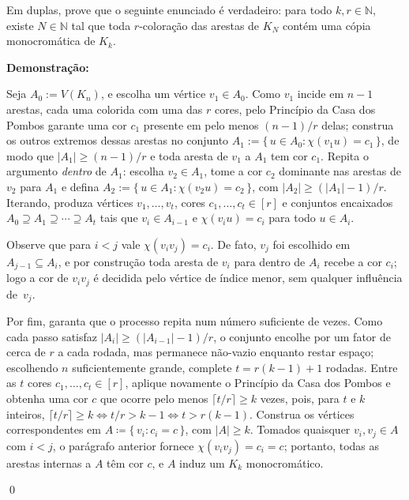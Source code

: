 \documentclass[12pt]{article}
\newenvironment{problem}[2][Exercício]{\begin{trivlist}
\item[\hskip \labelsep {\bfseries #1}\hskip \labelsep {\bfseries #2.}]}{\end{trivlist}}
\newenvironment{sol}
    {\textbf{Demonstração:}\emph{}
    }
    {
    \qed
    }
\begin{document}

\begin{problem}{1}
    Em duplas, prove que o seguinte enunciado é verdadeiro: para todo $k, r \in \mathbb{N}$, existe $N \in \mathbb{N}$ tal que toda $r$-coloração das arestas de $K_N$ contém uma cópia monocromática de $K_k$.
\end{problem}
\begin{sol}
    Seja $A_0:=V(K_n)$, e escolha um vértice $v_1\in A_0$. Como $v_1$ incide em
    $n-1$ arestas, cada uma colorida com uma das $r$ cores, pelo Princípio da Casa dos Pombos garante uma cor $c_1$ presente em pelo menos $(n-1)/r$ delas; construa os outros extremos dessas arestas no conjunto $A_1:=\{\,u\in A_0:\chi(v_1u)=c_1\,\}$, de modo que $|A_1|\ge (n-1)/r$ e toda aresta de $v_1$ a $A_1$ tem cor $c_1$. Repita o argumento \emph{dentro} de $A_1$: escolha $v_2\in A_1$, tome a cor $c_2$ dominante nas arestas de $v_2$ para $A_1$ e defina $A_2:=\{\,u\in A_1:\chi(v_2u)=c_2\,\}$, com $|A_2|\ge(|A_1|-1)/r$. Iterando, produza
    vértices $v_1,\dots,v_t$, cores $c_1,\dots,c_t\in[r]$ e conjuntos encaixados
    $A_0\supseteq A_1\supseteq\cdots\supseteq A_t$ tais que $v_i\in A_{i-1}$ e
    $\chi(v_iu)=c_i$ para todo $u\in A_i$.
     
    Observe que para $i<j$ vale $\chi(v_iv_j)=c_i$. De fato, $v_j$ foi escolhido em $A_{j-1}\subseteq A_i$, e por construção toda aresta de $v_i$ para dentro de $A_i$ recebe a cor $c_i$; logo a cor de $v_iv_j$ é decidida pelo vértice de índice menor, sem qualquer influência de~$v_j$.

    Por fim, garanta que o processo repita num número suficiente de vezes. Como cada passo satisfaz $|A_i|\ge(|A_{i-1}|-1)/r$, o conjunto encolhe por um fator de cerca de $r$ a cada rodada, mas permanece não-vazio enquanto restar espaço; escolhendo $n$ suficientemente grande, complete $t=r(k-1)+1$ rodadas. Entre as $t$ cores $c_1,\dots,c_t\in[r]$, aplique novamente o Princípio da Casa dos Pombos e obtenha uma cor $c$ que ocorre pelo menos $\lceil t/r\rceil\ge k$ vezes, pois, para $t$ e $k$ inteiros, $\lceil t/r\rceil\ge k\iff t/r>k-1\iff t>r(k-1)$. Construa os vértices correspondentes em $A \coloneqq \{\,v_i:c_i=c\,\}$, com $|A|\ge k$. Tomados quaisquer $v_i,v_j\in A$ com $i<j$, o parágrafo anterior fornece $\chi(v_iv_j)=c_i=c$; portanto, todas as arestas internas a $A$ têm cor $c$, e $A$ induz um $K_k$ monocromático.
\end{sol}
\end{document}
